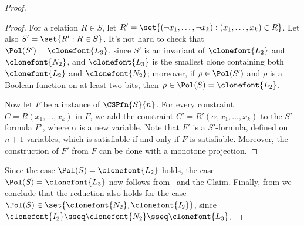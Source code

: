 \documentclass[11pt]{article}
\begin{document}
\begin{proof}
\begin{proof}
        For a relation $R \in S$,
        let $R' = \set{(\neg x_1,\dots, \neg x_k) : (x_1,\dots,x_k) \in R}$.
        Let also $S' = \set{R' : R \in S}$.
        It's not hard to check that 
        $\Pol(S') = \clonefont{L_3}$,
        since $S'$ is 
        an invariant of
        $\clonefont{L_2}$ and $\clonefont{N_2}$,
        and $\clonefont{L_3}$
        is the smallest clone containing both $\clonefont{L_2}$ and $\clonefont{N_2}$;
        moreover, if $\rho \in \Pol(S')$ and $\rho$ is a Boolean function on at
        least two bits, then
        $\rho \in \Pol(S) = \clonefont{L_2}$.

        Now let 
        $F$
        be a instance of $\CSPfn{S}{n}$.
        For every constraint $C = R(x_1,\dots,x_k)$ in $F$,
        we
        add the constraint
        $C' = R'(\alpha,x_1,\dots,x_k)$ to the $S'$-formula $F'$,
        where $\alpha$ is a new variable.
        Note that $F'$ is a $S'$-formula, defined on $n+1$ variables,
        which
        is satisfiable 
        if and only if $F$ is satisfiable.
        Moreover, the construction of $F'$ from $F$ can be done with a monotone
        projection.
    \end{proof}

    Since the case $\Pol(S) = \clonefont{L_2}$ holds,
    the case $\Pol(S) = \clonefont{L_3}$ now follows
    from~ and the Claim.
    Finally, from 
    we conclude that the 
    reduction
    also holds for the case
    $\Pol(S) \in \set{\clonefont{N_2},\clonefont{I_2}}$, since
    $\clonefont{I_2} \sseq \clonefont{N_2} \sseq \clonefont{L_3}$.
\end{proof}
\end{document}

